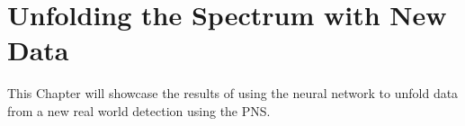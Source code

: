 \chapter{Unfolding the Spectrum with New Data}\label{chap_chap7}
This Chapter will showcase the results of using the neural network to unfold data from a new real world detection using the PNS.
